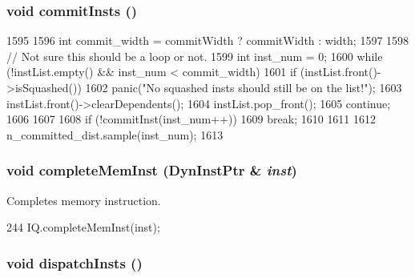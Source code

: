 \hypertarget{classBackEnd_ac8b85fbfdf330d000c094a9d1886d264}{
\subsubsection[{commitInsts}]{\setlength{\rightskip}{0pt plus 5cm}void commitInsts ()}}
\label{classBackEnd_ac8b85fbfdf330d000c094a9d1886d264}



\begin{DoxyCode}
1595 {
1596     int commit_width = commitWidth ? commitWidth : width;
1597 
1598     // Not sure this should be a loop or not.
1599     int inst_num = 0;
1600     while (!instList.empty() && inst_num < commit_width) {
1601         if (instList.front()->isSquashed()) {
1602             panic("No squashed insts should still be on the list!");
1603             instList.front()->clearDependents();
1604             instList.pop_front();
1605             continue;
1606         }
1607 
1608         if (!commitInst(inst_num++)) {
1609             break;
1610         }
1611     }
1612     n_committed_dist.sample(inst_num);
1613 }
\end{DoxyCode}
\hypertarget{classBackEnd_a2212f511dc1886c073cf7ff1665f5c87}{
\subsubsection[{completeMemInst}]{\setlength{\rightskip}{0pt plus 5cm}void completeMemInst ({\bf DynInstPtr} \& {\em inst})}}
\label{classBackEnd_a2212f511dc1886c073cf7ff1665f5c87}
Completes memory instruction. 


\begin{DoxyCode}
244     { IQ.completeMemInst(inst); }
\end{DoxyCode}
\hypertarget{classBackEnd_ac3f94deccc87588d728716efc4dd7ce8}{
\subsubsection[{dispatchInsts}]{\setlength{\rightskip}{0pt plus 5cm}void dispatchInsts ()}}
\label{classBackEnd_ac3f94deccc87588d728716efc4dd7ce8}



